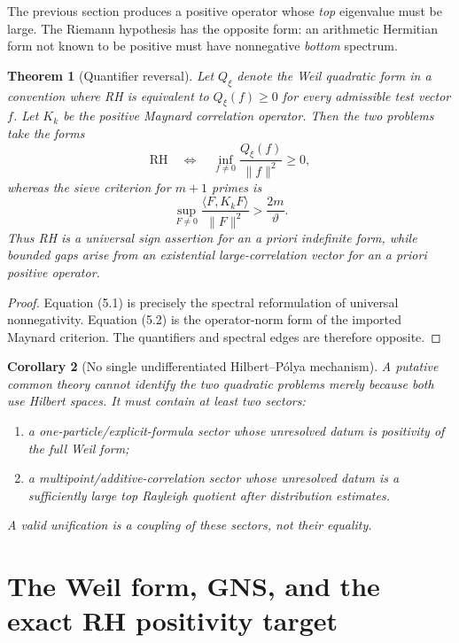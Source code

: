 \documentclass[11pt]{article}
\newtheorem{theorem}{Theorem}[section]
\newtheorem{corollary}[theorem]{Corollary}
\theoremstyle{definition}
\theoremstyle{remark}
\newcommand{\1}{\mathbf 1}
\begin{document}
The previous section produces a positive operator whose \emph{top} eigenvalue must be large.  The Riemann hypothesis has the opposite form: an arithmetic Hermitian form not known to be positive must have nonnegative \emph{bottom} spectrum.

\begin{theorem}[Quantifier reversal]
Let $Q_\xi$ denote the Weil quadratic form in a convention where RH is equivalent to $Q_\xi(f)\geq0$ for every admissible test vector $f$.  Let $K_k$ be the positive Maynard correlation operator.  Then the two problems take the forms
\[
\mathrm{RH}
\quad\Longleftrightarrow\quad
\inf_{f\neq0}\frac{Q_\xi(f)}{\|f\|^2}\geq0,
\tag{5.1}
\]
whereas the sieve criterion for $m+1$ primes is
\[
\sup_{F\neq0}\frac{\langle F,K_kF\rangle}{\|F\|^2}
>
\frac{2m}{\vartheta}.
\tag{5.2}
\]
Thus RH is a universal sign assertion for an a priori indefinite form, while bounded gaps arise from an existential large-correlation vector for an a priori positive operator.
\end{theorem}

\begin{proof}
Equation (5.1) is precisely the spectral reformulation of universal nonnegativity.  Equation (5.2) is the operator-norm form of the imported Maynard criterion.  The quantifiers and spectral edges are therefore opposite.
\end{proof}

\begin{corollary}[No single undifferentiated Hilbert--P\'olya mechanism]
A putative common theory cannot identify the two quadratic problems merely because both use Hilbert spaces.  It must contain at least two sectors:
\begin{enumerate}[label=(\roman*)]
\item a one-particle/explicit-formula sector whose unresolved datum is positivity of the full Weil form;
\item a multipoint/additive-correlation sector whose unresolved datum is a sufficiently large top Rayleigh quotient after distribution estimates.
\end{enumerate}
A valid unification is a coupling of these sectors, not their equality.
\end{corollary}

\section{The Weil form, GNS, and the exact RH positivity target}
\end{document}
